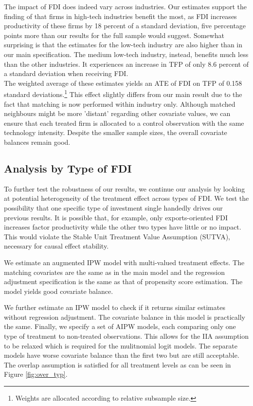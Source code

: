 \documentclass[a4paper,11pt]{scrartcl}
\begin{document}
The impact of FDI does indeed vary across industries. Our estimates support the finding of \citet{Keller2009} that firms in high-tech industries benefit the most, as FDI increases productivity of these firms by 18 percent of a standard deviation, five percentage points more than our results for the full sample would suggest. Somewhat surprising is that the estimates for the low-tech industry are also higher than in our main specification. The medium low-tech industry, instead, benefits much less than the other industries. It experiences an increase in TFP of only 8.6 percent of a standard deviation when receiving FDI. \\

The weighted average of these estimates yields an ATE of FDI on TFP of 0.158 standard deviations.\footnote{Weights are allocated according to relative subsample size.} This effect slightly differs from our main result due to the fact that matching is now performed within industry only. Although matched neighbours might be more 'distant' regarding other covariate values, we can ensure that each treated firm is allocated to a control observation with the same technology intensity. Despite the smaller sample sizes, the overall covariate balances remain good. 


\subsection{Analysis by Type of FDI}

To further test the robustness of our results, %
we continue our analysis by looking at potential heterogeneity of the treatment effect across types of FDI. We test the possibility that one specific type of investment single handedly drives our previous results. It is possible that, for example, only exports-oriented FDI increases factor productivity while the other two types have little or no impact. This would violate the Stable Unit Treatment Value Assumption (SUTVA), necessary for causal effect stability. 

We estimate an augmented IPW model with multi-valued treatment effects. The matching covariates are the same as in the main model and the regression adjustment specification is the same as that of propensity score estimation. The model yields good covariate balance.

We further estimate an IPW model to check if it returns similar estimates without regression adjustment. The covariate balance in this model is practically the same. Finally, we specify a set of AIPW models, each comparing only one type of treatment to non-treated observations. This allows for the IIA assumption to be relaxed which is required for the mulitnomial logit models. The separate models have worse covariate balance than the first two but are still acceptable. The overlap assumption is satisfied for all treatment levels as can be seen in Figure \ref{fig:over_typ}. 
\end{document}
